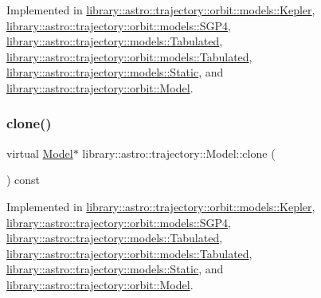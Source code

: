 Implemented in \hyperlink{classlibrary_1_1astro_1_1trajectory_1_1orbit_1_1models_1_1_kepler_a6354b3545decf1179289383679ebe2cd}{library\+::astro\+::trajectory\+::orbit\+::models\+::\+Kepler}, \hyperlink{classlibrary_1_1astro_1_1trajectory_1_1orbit_1_1models_1_1_s_g_p4_a5d94d349c464f7313017c795a9346084}{library\+::astro\+::trajectory\+::orbit\+::models\+::\+S\+G\+P4}, \hyperlink{classlibrary_1_1astro_1_1trajectory_1_1models_1_1_tabulated_a6d23f5721930d9e885eb3b763ab3390a}{library\+::astro\+::trajectory\+::models\+::\+Tabulated}, \hyperlink{classlibrary_1_1astro_1_1trajectory_1_1orbit_1_1models_1_1_tabulated_a43db203d7257d25a5a3a6f0e03e62b7d}{library\+::astro\+::trajectory\+::orbit\+::models\+::\+Tabulated}, \hyperlink{classlibrary_1_1astro_1_1trajectory_1_1models_1_1_static_ae4bc6aceab498868e4ebe2a65c6aa413}{library\+::astro\+::trajectory\+::models\+::\+Static}, and \hyperlink{classlibrary_1_1astro_1_1trajectory_1_1orbit_1_1_model_a34198a504836b9779425da99d964d19c}{library\+::astro\+::trajectory\+::orbit\+::\+Model}.

\mbox{\label{classlibrary_1_1astro_1_1trajectory_1_1_model_ad6181e14aea57534897e7446a2a27578}} 
\subsubsection{\texorpdfstring{clone()}{clone()}}
{\footnotesize\ttfamily virtual \hyperlink{classlibrary_1_1astro_1_1trajectory_1_1_model}{Model}$\ast$ library\+::astro\+::trajectory\+::\+Model\+::clone (\begin{DoxyParamCaption}{ }\end{DoxyParamCaption}) const\hspace{0.3cm}{\ttfamily [pure virtual]}}



Implemented in \hyperlink{classlibrary_1_1astro_1_1trajectory_1_1orbit_1_1models_1_1_kepler_ac78a023cde4a61c62309051c9147d66e}{library\+::astro\+::trajectory\+::orbit\+::models\+::\+Kepler}, \hyperlink{classlibrary_1_1astro_1_1trajectory_1_1orbit_1_1models_1_1_s_g_p4_afa3add6c6855ac1da5632b17986dca02}{library\+::astro\+::trajectory\+::orbit\+::models\+::\+S\+G\+P4}, \hyperlink{classlibrary_1_1astro_1_1trajectory_1_1models_1_1_tabulated_a192cfb0ceb4a11d02578adc9702cabc1}{library\+::astro\+::trajectory\+::models\+::\+Tabulated}, \hyperlink{classlibrary_1_1astro_1_1trajectory_1_1orbit_1_1models_1_1_tabulated_a8ccec23a49086c6c3fbda2cc81e7a4dc}{library\+::astro\+::trajectory\+::orbit\+::models\+::\+Tabulated}, \hyperlink{classlibrary_1_1astro_1_1trajectory_1_1models_1_1_static_a3586bbfdd6fc3958b18a2ffcb3b23fd4}{library\+::astro\+::trajectory\+::models\+::\+Static}, and \hyperlink{classlibrary_1_1astro_1_1trajectory_1_1orbit_1_1_model_a45d75e4d212a9bb01aa596eaeeae43ae}{library\+::astro\+::trajectory\+::orbit\+::\+Model}.

